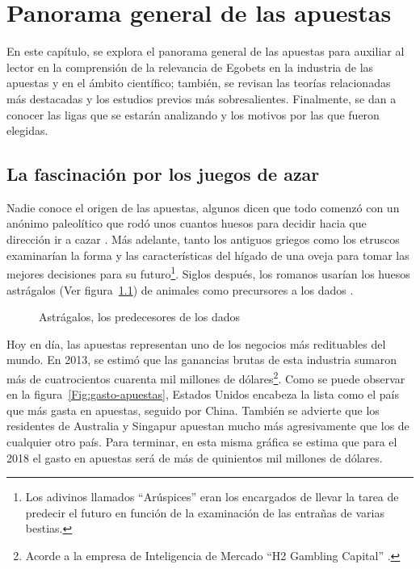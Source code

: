 \graphicspath{{/Users/brunomedina/Dropbox/Tesis-Egobets/egobets-notas/resources/marco/}}
\chapter{Panorama general de las apuestas}
\label{chap:general}

En este capítulo, se explora el panorama general de las apuestas para auxiliar al lector en la comprensión de la relevancia de Egobets en la industria de las apuestas y en el ámbito científico; también, se revisan las teorías relacionadas más destacadas y los estudios previos más sobresalientes. Finalmente, se dan a conocer las ligas que se estarán analizando y los motivos por las que fueron elegidas.

 \section{La fascinación por los juegos de azar}
 \label{sec:fascinacion}
 

Nadie conoce el origen de las apuestas, algunos dicen que todo comenzó con un anónimo paleolítico que rodó unos cuantos huesos para decidir hacia que dirección ir a cazar \cite{schwartz2013roll}. Más adelante, tanto los antiguos griegos como los etruscos examinarían la forma y las características del hígado de una oveja para tomar las mejores decisiones para su futuro\footnote{Los adivinos llamados ``Arúspices'' eran los encargados de llevar la tarea de predecir el futuro en función de la examinación de las entrañas de varias bestias.}. Siglos después, los romanos usarían los huesos astrágalos (Ver figura~\ref{Fig:huesos}) de animales como precursores a los dados \cite{schwartz2013roll}.

\begin{figure}[!htb]\centering
   \begin {minipage}{0.85\textwidth}
     \caption{Astrágalos, los predecesores de los dados}\label{Fig:huesos}
   \end{minipage}
\end{figure}

Hoy en día, las apuestas representan uno de los negocios más redituables del mundo. En 2013, se estimó que las ganancias brutas de esta industria sumaron más de cuatrocientos cuarenta mil millones de dólares\footnote{Acorde a la empresa de Inteligencia de Mercado ``H2 Gambling Capital'' \cite{economistHouseWins}.}. Como se puede observar en la figura~\ref{Fig:gasto-apuestas}, Estados Unidos encabeza la lista como el país que más gasta en apuestas, seguido por China. También se advierte que los residentes de Australia y Singapur apuestan mucho más agresivamente que los de cualquier otro país. Para terminar, en esta misma gráfica se estima que para el 2018 el gasto en apuestas será de más de quinientos mil millones de dólares.


